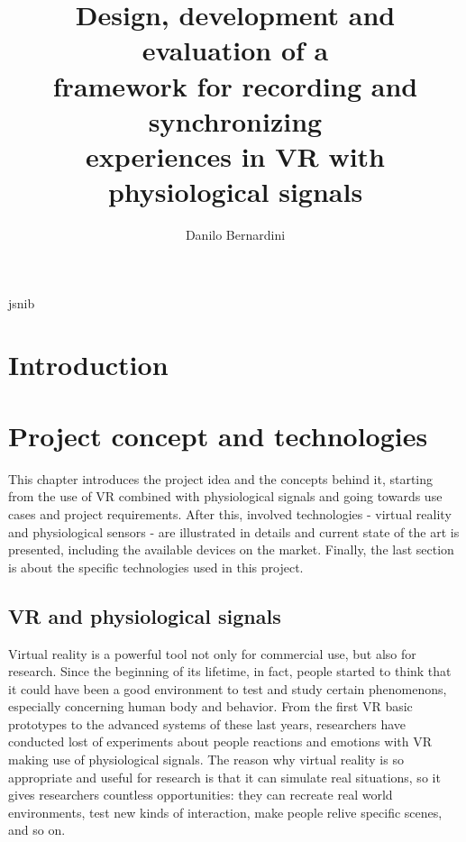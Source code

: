 \documentclass[binding=0.6cm,LaM]{sapthesis}
\title{Design, development and evaluation of a \\framework for recording and synchronizing \\experiences in VR with physiological signals}
\author{Danilo Bernardini}
\begin{document}
\frontmatter
\maketitle

\begin{acknowledgments} 
jsnib

\end{acknowledgments}

\tableofcontents
\mainmatter
\chapter{Introduction}



\chapter{Project concept and technologies}

This chapter introduces the project idea and the concepts behind it, starting from the use of VR combined with physiological signals and going towards use cases and project requirements. After this, involved technologies - virtual reality and physiological sensors - are illustrated in details and current state of the art is presented, including the available devices on the market. Finally, the last section is about the specific technologies used in this project.

\section{VR and physiological signals}
Virtual reality is a powerful tool not only for commercial use, but also for research. Since the beginning of its lifetime, in fact, people started to think that it could have been a good environment to test and study certain phenomenons, especially concerning human body and behavior. From the first VR basic prototypes to the advanced systems of these last years, researchers have conducted lost of experiments about people reactions and emotions with VR making use of physiological signals. The reason why virtual reality is so appropriate and useful for research is that it can simulate real situations, so it gives researchers countless opportunities: they can recreate real world environments, test new kinds of interaction, make people relive specific scenes, and so on. 
\end{document}
